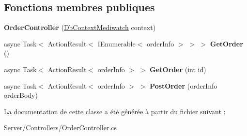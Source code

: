 \subsection*{Fonctions membres publiques}
\begin{DoxyCompactItemize}
\item 
\mbox{\label{class_mediwatch_1_1_server_1_1_controllers_1_1_order_controller_a7820bde5a95ff51ebdc8ccc172f92746}} 
{\bfseries Order\+Controller} (\hyperlink{class_server_1_1_db_context_mediwatch}{Db\+Context\+Mediwatch} context)
\item 
\mbox{\label{class_mediwatch_1_1_server_1_1_controllers_1_1_order_controller_a977619eed4668581708a08aada1a9b9c}} 
async Task$<$ Action\+Result$<$ I\+Enumerable$<$ order\+Info $>$ $>$ $>$ {\bfseries Get\+Order} ()
\item 
\mbox{\label{class_mediwatch_1_1_server_1_1_controllers_1_1_order_controller_ad52f797fdca095d1abb72ef0b20d03cc}} 
async Task$<$ Action\+Result$<$ order\+Info $>$ $>$ {\bfseries Get\+Order} (int id)
\item 
\mbox{\label{class_mediwatch_1_1_server_1_1_controllers_1_1_order_controller_a40c08db38a82cf02eaf7c84acb05f169}} 
async Task$<$ Action\+Result$<$ order\+Info $>$ $>$ {\bfseries Post\+Order} (order\+Info order\+Body)
\end{DoxyCompactItemize}


La documentation de cette classe a été générée à partir du fichier suivant \+:\begin{DoxyCompactItemize}
\item 
Server/\+Controllers/Order\+Controller.\+cs\end{DoxyCompactItemize}
